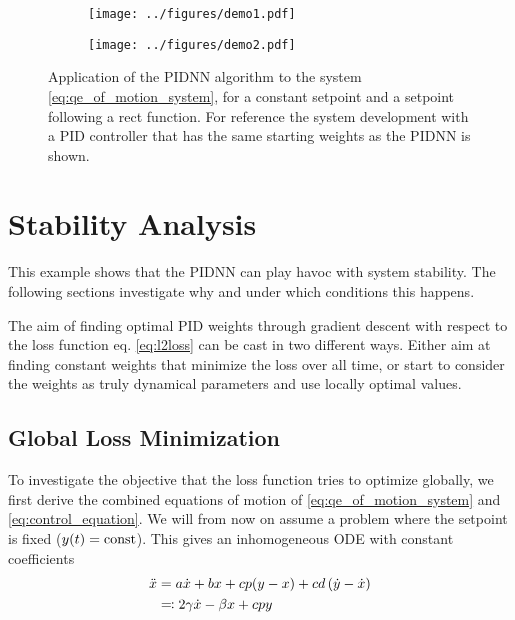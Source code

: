 \documentclass{article}
\begin{document}
    \begin{figure}[tb]
    \begin{subfigure}[c]{0.5\textwidth}
        \texttt{[image: ../figures/demo1.pdf]}
        \label{fig:demo:converging}
    \end{subfigure}
    \begin{subfigure}[c]{0.5\textwidth}
        \texttt{[image: ../figures/demo2.pdf]}
        \label{fig:demo:diverging}
    \end{subfigure}
    \caption{Application of the PIDNN algorithm to the system \eqref{eq:qe_of_motion_system}, for a constant setpoint 
    and a setpoint following a rect function. For reference
    the system development with a PID controller that has the same starting weights as the PIDNN is shown.}
    \label{fig:demo}
    \end{figure}














  \section{Stability Analysis}
    This example shows that the PIDNN can play havoc with system stability. The following sections investigate why and 
    under which conditions this happens. 

    The aim of finding optimal PID weights through gradient descent with respect to the loss function eq. 
    \eqref{eq:l2loss} can be cast in two different ways. Either aim at finding constant weights that minimize the loss 
    over all time, or start to consider the weights as truly dynamical parameters and use locally optimal values.



  \subsection{Global Loss Minimization}
    \label{sq:L2Loss}
    To investigate the objective that the loss function tries to optimize globally, we first derive the combined 
    equations of motion of \eqref{eq:qe_of_motion_system} and \eqref{eq:control_equation}.
    We will from now on assume a problem where the setpoint is fixed ($y(t) = \operatorname{const}$).
    This gives an inhomogeneous ODE with constant coefficients 
    \begin{align}
        \ddot{x} &= a \dot{x} + b x + c p (y - x) + c d \left( \dot{y} - \dot{x} \right)\\ \nonumber
        &\eqqcolon 2\gamma  \dot{x} - \beta x + c p y
    \end{align}
\end{document}
